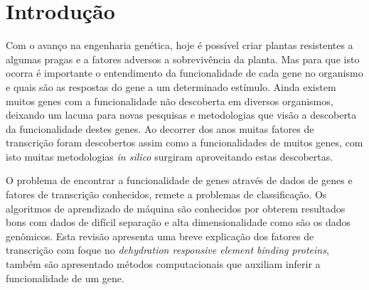 \chapter{Introdução}

Com o avanço na engenharia genética, hoje é possível criar plantas resistentes a algumas pragas e a fatores adversos a sobrevivência da planta. Mas para que isto ocorra é importante o entendimento da funcionalidade de cada gene no organismo e quais são as respostas do gene a um determinado estímulo. Ainda existem muitos genes com a funcionalidade não descoberta em diversos organismos, deixando um lacuna para novas pesquisas e metodologias que visão a descoberta da funcionalidade destes genes. Ao decorrer dos anos muitas fatores de transcrição foram descobertos assim como a funcionalidades de muitos genes, com isto muitas metodologias \textit{in silico} surgiram aproveitando estas descobertas. 

O problema de encontrar a funcionalidade de genes através de dados de genes e fatores de transcrição conhecidos, remete a problemas de classificação. Os algoritmos de aprendizado de máquina são conhecidos por obterem resultados bons com dados de difícil separação e alta dimensionalidade como são os dados genômicos. Esta revisão apresenta uma breve explicação dos  fatores de transcrição com foque no \textit{dehydration responsive element binding proteins}, também são apresentado métodos computacionais que auxiliam inferir a funcionalidade de um gene.
